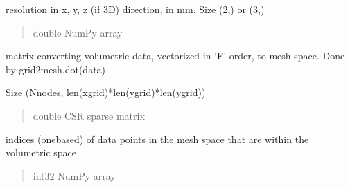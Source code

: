 \documentclass[letterpaper,10pt,english]{sphinxmanual}
\begin{document}
\begin{fulllineitems}
\begin{fulllineitems}
\begin{quote}
\begin{description}
\end{description}\end{quote}

\end{fulllineitems}


\begin{fulllineitems}
\label{\detokenize{_autosummary/nirfasterff.base.data.meshvol:nirfasterff.base.data.meshvol.res}}
\pysigstartsignatures
{}
\pysigstopsignatures
\sphinxAtStartPar
resolution in x, y, z (if 3D) direction, in mm. Size (2,) or (3,)
\begin{quote}\begin{description}
\sphinxAtStartPar
double NumPy array

\end{description}\end{quote}

\end{fulllineitems}


\begin{fulllineitems}
\label{\detokenize{_autosummary/nirfasterff.base.data.meshvol:nirfasterff.base.data.meshvol.grid2mesh}}
\pysigstartsignatures
{}
\pysigstopsignatures
\sphinxAtStartPar
matrix converting volumetric data, vectorized in ‘F’ order, to mesh space. Done by grid2mesh.dot(data)

\sphinxAtStartPar
Size (Nnodes, len(xgrid)*len(ygrid)*len(ygrid))
\begin{quote}\begin{description}
\sphinxAtStartPar
double CSR sparse matrix

\end{description}\end{quote}

\end{fulllineitems}


\begin{fulllineitems}
\label{\detokenize{_autosummary/nirfasterff.base.data.meshvol:nirfasterff.base.data.meshvol.meshingrid}}
\pysigstartsignatures
{}
\pysigstopsignatures
\sphinxAtStartPar
indices (one\sphinxhyphen{}based) of data points in the mesh space that are within the volumetric space
\begin{quote}\begin{description}
\sphinxAtStartPar
int32 NumPy array


\end{description}
\end{quote}
\end{fulllineitems}
\end{fulllineitems}
\end{document}
